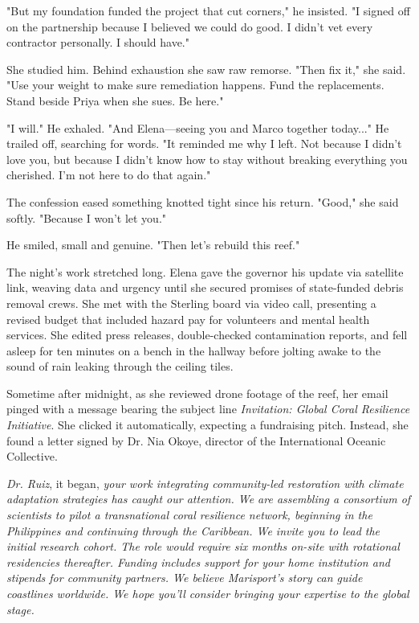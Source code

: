 "But my foundation funded the project that cut corners," he insisted. "I signed off on the partnership because I believed we could do good. I didn't vet every contractor personally. I should have."

She studied him. Behind exhaustion she saw raw remorse. "Then fix it," she said. "Use your weight to make sure remediation happens. Fund the replacements. Stand beside Priya when she sues. Be here."

"I will." He exhaled. "And Elena—seeing you and Marco together today..." He trailed off, searching for words. "It reminded me why I left. Not because I didn't love you, but because I didn't know how to stay without breaking everything you cherished. I'm not here to do that again."

The confession eased something knotted tight since his return. "Good," she said softly. "Because I won't let you."

He smiled, small and genuine. "Then let's rebuild this reef."

The night's work stretched long. Elena gave the governor his update via satellite link, weaving data and urgency until she secured promises of state-funded debris removal crews. She met with the Sterling board via video call, presenting a revised budget that included hazard pay for volunteers and mental health services. She edited press releases, double-checked contamination reports, and fell asleep for ten minutes on a bench in the hallway before jolting awake to the sound of rain leaking through the ceiling tiles.

Sometime after midnight, as she reviewed drone footage of the reef, her email pinged with a message bearing the subject line \textit{Invitation: Global Coral Resilience Initiative}. She clicked it automatically, expecting a fundraising pitch. Instead, she found a letter signed by Dr. Nia Okoye, director of the International Oceanic Collective.

\textit{Dr. Ruiz}, it began, \textit{your work integrating community-led restoration with climate adaptation strategies has caught our attention. We are assembling a consortium of scientists to pilot a transnational coral resilience network, beginning in the Philippines and continuing through the Caribbean. We invite you to lead the initial research cohort. The role would require six months on-site with rotational residencies thereafter. Funding includes support for your home institution and stipends for community partners. We believe Marisport's story can guide coastlines worldwide. We hope you'll consider bringing your expertise to the global stage.}

